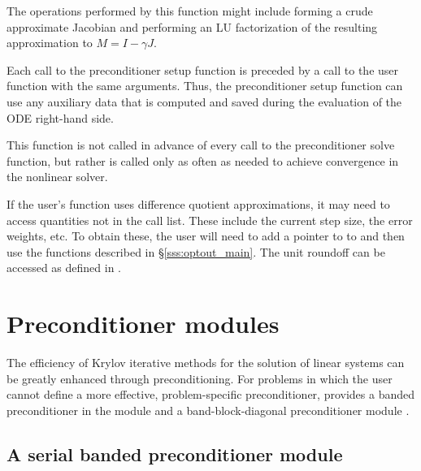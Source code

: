 {
  The operations performed by this function might include forming a crude
  approximate Jacobian and performing an LU factorization of the resulting
  approximation to $M=I - \gamma J$.

  Each call to the preconditioner setup function is preceded by a call to
  the  user function with the same  arguments.
  Thus, the preconditioner setup function can use any auxiliary data that is
  computed and saved during the evaluation of the ODE right-hand side.

  This function is not called in advance of every call to the preconditioner
  solve function, but rather is called only as often as needed to achieve
  convergence in the nonlinear solver.

  If the user's  function uses difference quotient
  approximations, it may need to access quantities not in the call
  list. These include the current step size, the error weights, etc.
  To obtain these, the user will need to add a pointer to 
  to  and then use the  functions described in
  \S\ref{sss:optout_main}. The unit roundoff can be accessed as
   defined in .
}


\section{Preconditioner modules}\label{ss:preconds}

The efficiency of Krylov iterative methods for the solution of linear systems
can be greatly enhanced through preconditioning. For problems in which the
user cannot define a more effective, problem-specific preconditioner,
{\cvode} provides a banded preconditioner in the module {\cvbandpre} and
a band-block-diagonal preconditioner module {\cvbbdpre}.

\subsection{A serial banded preconditioner module}\label{sss:cvbandpre}


